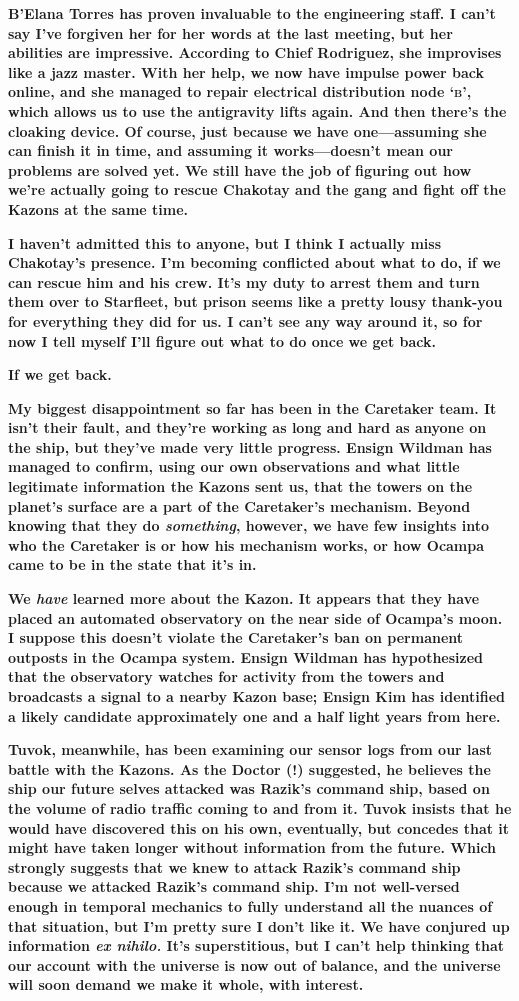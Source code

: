 \documentclass[twoside,letterpaper,12pt]{memoir}
\begin{document}
\textbf{B'Elana Torres has proven invaluable to the engineering staff. I can't say I've forgiven her for her words at the last meeting, but her abilities are impressive. According to Chief Rodriguez, she improvises like a jazz master. With her help, we now have impulse power back online, and she managed to repair electrical distribution node `\textsc{b}', which allows us to use the antigravity lifts again. And then there's the cloaking device. Of course, just because we have one---assuming she can finish it in time, and assuming it works---doesn't mean our problems are solved yet. We still have the job of figuring out how we're actually going to rescue Chakotay and the gang and fight off the Kazons at the same time. }

\textbf{I haven't admitted this to anyone, but I think I actually miss Chakotay's presence. I'm becoming conflicted about what to do, if we can rescue him and his crew. It's my duty to arrest them and turn them over to Starfleet, but prison seems like a pretty lousy thank-you for everything they did for us. I can't see any way around it, so for now I tell myself I'll figure out what to do once we get back.} 

\textbf{If we get back.} 

\textbf{My biggest disappointment so far has been in the Caretaker team. It isn't their fault, and they're working as long and hard as anyone on the ship, but they've made very little progress. Ensign Wildman has managed to confirm, using our own observations and what little legitimate information the Kazons sent us, that the towers on the planet's surface are a part of the Caretaker's mechanism. Beyond knowing that they do \textit{something}, however, we have few insights into who the Caretaker is or how his mechanism works, or how Ocampa came to be in the state that it's in.} 

\textbf{We \textit{have} learned more about the Kazon. It appears that they have placed an automated observatory on the near side of Ocampa's moon. I suppose this doesn't violate the Caretaker's ban on permanent outposts in the Ocampa system. Ensign Wildman has hypothesized that the observatory watches for activity from the towers and broadcasts a signal to a nearby Kazon base; Ensign Kim has identified a likely candidate approximately one and a half light years from here. }

\textbf{Tuvok, meanwhile, has been examining our sensor logs from our last battle with the Kazons. As the Doctor (!) suggested, he believes the ship our future selves attacked was Razik's command ship, based on the volume of radio traffic coming to and from it. Tuvok insists that he would have discovered this on his own, eventually, but concedes that it might have taken longer without information from the future. Which strongly suggests that we knew to attack Razik's command ship because we attacked Razik's command ship. I'm not well-versed enough in temporal mechanics to fully understand all the nuances of that situation, but I'm pretty sure I don't like it. We have conjured up information \textit{ex nihilo.}
It's superstitious, but I can't help thinking that our account with the universe is now out of balance, and the universe will soon demand we make it whole, with interest.} 
\end{document}
